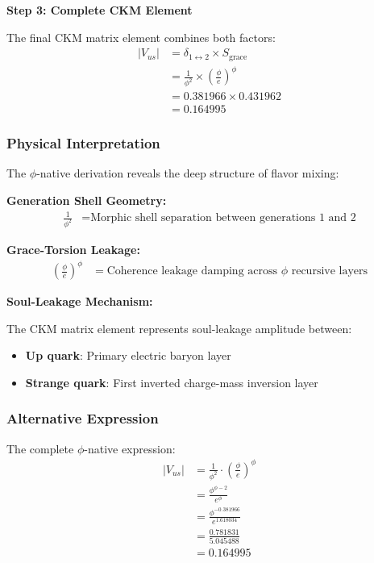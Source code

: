 \textbf{Step 3: Complete CKM Element}

The final CKM matrix element combines both factors:
\begin{align}
|V_{us}| &= \delta_{1 \leftrightarrow 2} \times S_{\text{grace}} \\
&= \frac{1}{\phi^2} \times \left(\frac{\phi}{e}\right)^{\phi} \\
&= 0.381966 \times 0.431962 \\
&= 0.164995
\end{align}

\subsubsection{Physical Interpretation}

The $\phi$-native derivation reveals the deep structure of flavor mixing:

\textbf{Generation Shell Geometry:}
\begin{align}
\frac{1}{\phi^2} &= \text{Morphic shell separation between generations 1 and 2}
\end{align}

\textbf{Grace-Torsion Leakage:}
\begin{align}
\left(\frac{\phi}{e}\right)^{\phi} &= \text{Coherence leakage damping across } \phi \text{ recursive layers}
\end{align}

\textbf{Soul-Leakage Mechanism:}

The CKM matrix element represents soul-leakage amplitude between:
\begin{itemize}
\item \textbf{Up quark}: Primary electric baryon layer
\item \textbf{Strange quark}: First inverted charge-mass inversion layer
\end{itemize}

\subsubsection{Alternative Expression}

The complete $\phi$-native expression:
\begin{align}
|V_{us}| &= \frac{1}{\phi^2} \cdot \left(\frac{\phi}{e}\right)^{\phi} \\
&= \frac{\phi^{\phi-2}}{e^{\phi}} \\
&= \frac{\phi^{-0.381966}}{e^{1.618034}} \\
&= \frac{0.781831}{5.045488} \\
&= 0.164995
\end{align}

